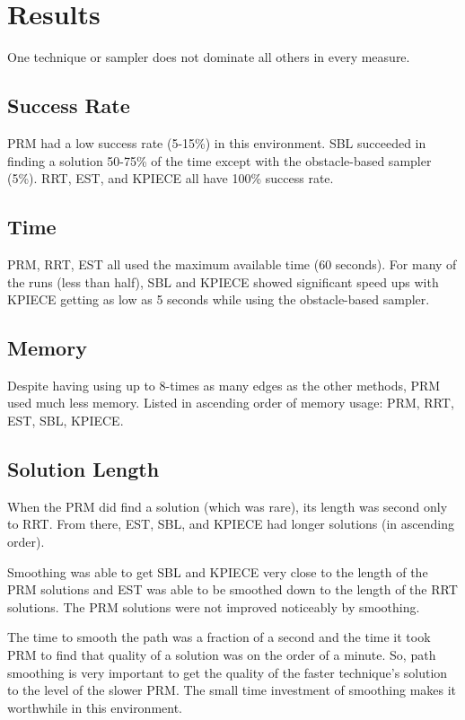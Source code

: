 \documentclass[twocolumn]{article}
\begin{document}
\section{Results}

One technique or sampler does not dominate all others in every measure.

\subsection{Success Rate}

PRM had a low success rate (5-15\%) in this environment. SBL succeeded in finding a solution 50-75\% of the time except with the obstacle-based sampler (5\%).  RRT, EST, and KPIECE all have 100\% success rate.


\subsection{Time}

PRM, RRT, EST all used the maximum available time (60 seconds). For many of the runs (less than half), SBL and KPIECE showed significant speed ups with KPIECE getting as low as 5 seconds while using the obstacle-based sampler.


\subsection{Memory}

Despite having using up to 8-times as many edges as the other methods, PRM used much less memory. Listed in ascending order of memory usage: PRM, RRT, EST, SBL, KPIECE.


\subsection{Solution Length}

When the PRM did find a solution (which was rare), its length was second only to RRT. From there, EST, SBL, and KPIECE had longer solutions (in ascending order).

Smoothing was able to get SBL and KPIECE very close to the length of the PRM solutions and EST was able to be smoothed down to the length of the RRT solutions. The PRM solutions were not improved noticeably by smoothing.

The time to smooth the path was a fraction of a second and the time it took PRM to find that quality of a solution was on the order of a minute. So, path smoothing is very important to get the quality of the faster technique's solution to the level of the slower PRM. The small time investment of smoothing makes it worthwhile in this environment.
\end{document}
